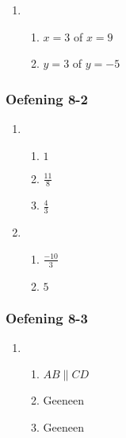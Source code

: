 {\begin{multicols}{3}
\begin{enumerate}[label=\textbf{\arabic*}.]
\item %
 \begin{enumerate}[noitemsep, label=\textbf{(\alph*)} ] 
\item $x = 3$ of $x = 9$%
\item $y=3$ of $y=-5$%
\end{enumerate}
\end{enumerate}

\subsubsection*{Oefening 8-2} %
\begin{enumerate}[noitemsep, label=\textbf{\arabic*}. ]
\item %
 \begin{enumerate}[itemsep=1pt, label=\textbf{(\alph*)} ] 
\item $1$%
\item $\frac{11}{8}$%
\item $\frac{4}{3}$%
\end{enumerate}

\item %
\begin{enumerate}[itemsep=1pt, label=\textbf{(\alph*)} ] 
\item $\frac{-10}{3}$%
\item $5$%
\end{enumerate}
\end{enumerate}


\subsubsection*{Oefening 8-3} %
  \begin{enumerate}[noitemsep, label=\textbf{\arabic*}. ]

\item %
\begin{enumerate}[noitemsep, label=\textbf{(\alph*)} ]
\item $AB \parallel CD$%
\item Geeneen%
\item Geeneen%
\end{enumerate}


\end{enumerate}
\end{multicols}}
